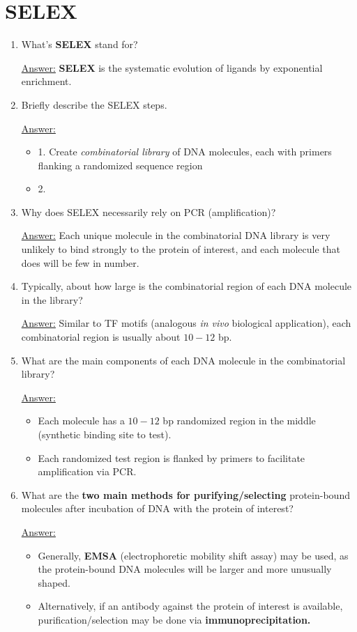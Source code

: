 \documentclass{article}
\newenvironment{QandA}{\begin{enumerate}[label=\bfseries Q\arabic*.]}
                       {\end{enumerate}}
\newenvironment{answered}{\par\normalfont\underline{Answer:}}{}
\begin{document}
\section{SELEX}
\begin{QandA}
  \item{What's \textbf{SELEX} stand for?}
    \begin{answered}
    \textbf{SELEX} is the systematic evolution of ligands by exponential enrichment.
    \end{answered}
  \item{Briefly describe the SELEX steps.}
    \begin{answered}
    \begin{itemize}
      \item{1. Create \textit{combinatorial library} of DNA molecules, each with primers flanking a randomized sequence region}
      \item{2. }
    \end{itemize}
    \end{answered}
  \item{Why does SELEX necessarily rely on PCR (amplification)?}
    \begin{answered}
    Each unique molecule in the combinatorial DNA library is very unlikely to bind strongly to the protein of interest, and each molecule that does will be few in number.
    \end{answered}
  \item{Typically, about how large is the combinatorial region of each DNA molecule in the library?}
    \begin{answered}
    Similar to TF motifs (analogous \textit{in vivo} biological application), each combinatorial region is usually about $10-12$ bp. 
    \end{answered}
  \item{What are the main components of each DNA molecule in the combinatorial library?}
    \begin{answered}
    \begin{itemize}
      \item{Each molecule has a $10-12$ bp randomized region in the middle (synthetic binding site to test).}
      \item{Each randomized test region is flanked by primers to facilitate amplification via PCR.}
    \end{itemize}
    \end{answered}
  \item{What are the \textbf{two main methods for purifying/selecting} protein-bound molecules after incubation of DNA with the protein of interest?}
    \begin{answered}
    \begin{itemize}
      \item{Generally, \textbf{EMSA} (electrophoretic mobility shift assay) may be used, as the protein-bound DNA molecules will be larger and more unusually shaped.}
      \item{Alternatively, if an antibody against the protein of interest is available, purification/selection may be done via \textbf{immunoprecipitation.}}
    \end{itemize}
    \end{answered}
\end{QandA}
\end{document}

